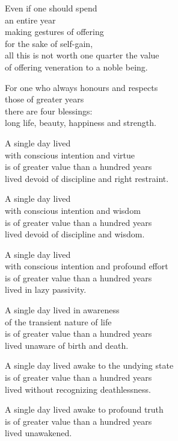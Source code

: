 Even if one should spend\\
an entire year\\
making gestures of offering\\
for the sake of self-gain,\\
all this is not worth one quarter the value\\
of offering veneration to a noble being.


For one who always honours and respects\\
those of greater years\\
there are four blessings:\\
long life, beauty, happiness and strength.


A single day lived\\
with conscious intention and virtue\\
is of greater value than a hundred years\\
lived devoid of discipline and right restraint.


A single day lived\\
with conscious intention and wisdom\\
is of greater value than a hundred years\\
lived devoid of discipline and wisdom.


A single day lived\\
with conscious intention and profound effort\\
is of greater value than a hundred years\\
lived in lazy passivity.


A single day lived in awareness\\
of the transient nature of life\\
is of greater value than a hundred years\\
lived unaware of birth and death.


A single day lived awake to the undying state\\
is of greater value than a hundred years\\
lived without recognizing deathlessness.

A single day lived awake to profound truth\\
is of greater value than a hundred years\\
lived unawakened.


